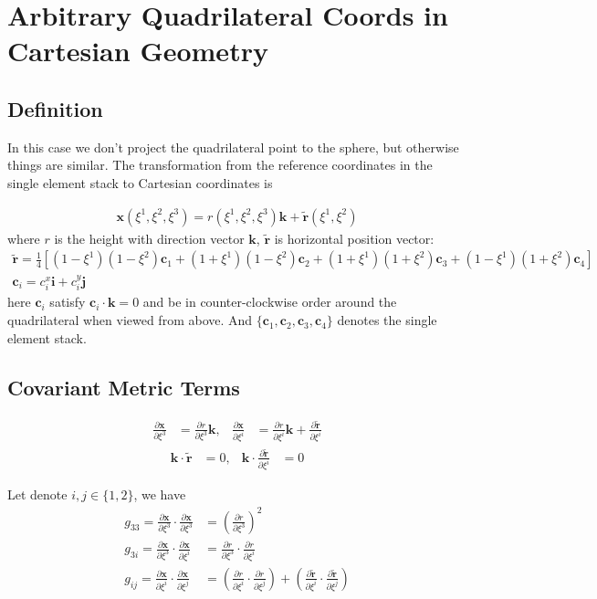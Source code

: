 \documentclass{report}
\newcommand{\vb}{\mathbf}
\newcommand{\tilder}{\widetilde{\vb{r}}}
\newcommand{\pdiff}[2]{\frac{\partial #1}{\partial #2}}
\begin{document}
\section{Arbitrary Quadrilateral Coords in Cartesian Geometry}

\subsection{Definition}

In this case we don't project the quadrilateral point to the sphere, but otherwise things are similar. The transformation from the reference coordinates in the single element stack to Cartesian coordinates is

\begin{align}\label{eq:phys-to-ref-cartesian}
\vb{x}(\xi^1,\xi^2,\xi^3) = r(\xi^1,\xi^2,\xi^3) \vb{k} + \tilder(\xi^1,\xi^2)
\end{align}
where $r$ is the height with direction vector $\vb{k}$, $\tilder$ is horizontal position vector:
\begin{align}
\label{eq:vbr-cartesian}
\tilder=\frac{1}{4} \left[ (1-\xi^1)(1-\xi^2) \vb{c}_1+(1+\xi^1)(1-\xi^2) \vb{c}_2+(1+\xi^1)(1+\xi^2) \vb{c}_3+(1-\xi^1)(1+\xi^2) \vb{c}_4 \right]\\
\vb{c}_i = c^x_i \vb{i} + c^y_i \vb{j}
\end{align}
here  $\vb{c}_i$ satisfy $\vb{c}_i \cdot \vb{k} = 0$ and be in counter-clockwise order around the quadrilateral when viewed from above.
And $\{\vb{c}_1, \vb{c}_2, \vb{c}_3, \vb{c}_4\}$ denotes the single element stack.


\subsection{Covariant Metric Terms}
\begin{align}
\pdiff{\vb{x}}{\xi^3} &= \pdiff{r}{\xi^3} \vb{k}, & \pdiff{\vb{x}}{\xi^i} &= \pdiff{r}{\xi^i} \vb{k} + \pdiff{\tilder}{\xi^i}
\end{align}
\begin{align}
\vb{k} \cdot \tilder &= 0, & \vb{k} \cdot \pdiff{\tilder}{\xi^i} &= 0
\end{align}

Let denote $i,j \in \{1,2\}$, we have
\begin{align}
\label{eq:g-cartesian}
g_{33} = \pdiff{\vb{x}}{\xi^3} \cdot \pdiff{\vb{x}}{\xi^3} &= \left( \pdiff{r}{\xi^3} \right)^2 \\
g_{3 i} = \pdiff{\vb{x}}{\xi^3} \cdot \pdiff{\vb{x}}{\xi^i} &= \pdiff{r}{\xi^3} \cdot \pdiff{r}{\xi^i} \\
g_{ij} = \pdiff{\vb{x}}{\xi^i} \cdot \pdiff{\vb{x}}{\xi^j} &= \left( \pdiff{r}{\xi^i} \cdot \pdiff{r}{\xi^j} \right) + \left( \pdiff{\tilder}{\xi^i} \cdot \pdiff{\tilder}{\xi^j} \right)
\end{align}
\end{document}
